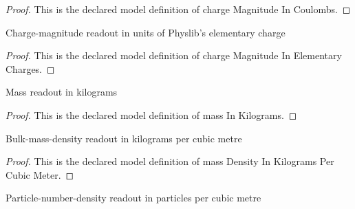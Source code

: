 \begin{proof}
  This is the declared model definition of charge Magnitude In Coulombs.
\end{proof}
\begin{definition}
  \label{def:physics:phyx-mini-0626:phyxminiproblems-problemphyxmini0626-chargemagnitudeinelementarycharges}
  Charge-magnitude readout in units of Physlib's elementary charge
\end{definition}
\begin{proof}
  This is the declared model definition of charge Magnitude In Elementary Charges.
\end{proof}
\begin{definition}
  \label{def:physics:phyx-mini-0626:phyxminiproblems-problemphyxmini0626-massinkilograms}
  Mass readout in kilograms
\end{definition}
\begin{proof}
  This is the declared model definition of mass In Kilograms.
\end{proof}
\begin{definition}
  \label{def:physics:phyx-mini-0626:phyxminiproblems-problemphyxmini0626-massdensityinkilogramspercubicmeter}
  Bulk-mass-density readout in kilograms per cubic metre
\end{definition}
\begin{proof}
  This is the declared model definition of mass Density In Kilograms Per Cubic Meter.
\end{proof}
\begin{definition}
  \label{def:physics:phyx-mini-0626:phyxminiproblems-problemphyxmini0626-numberdensitypercubicmeter}
  Particle-number-density readout in particles per cubic metre
\end{definition}
